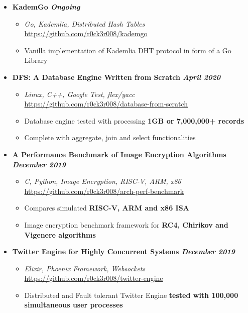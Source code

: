 \documentclass[9]{Resume}
\begin{document}
\begin{itemize}[noitemsep,nolistsep]
	\item[]\textbf{KademGo \hfill \textit{Ongoing}}
		\begin{itemize}[leftmargin=*]
			\setlength\itemsep{-0.25em}
			\item[\textbullet]\textit{Go, Kademlia, Distributed Hash Tables} \hfill \href{https://github.com/r0ck3r008/kademgo}{{\scriptsize https://github.com/r0ck3r008/kademgo}}
			\item[\textbullet]Vanilla implementation of Kademlia DHT protocol in form of a Go Library
		\end{itemize}

	\item[]\textbf{DFS: A Database Engine Written from Scratch \hfill \textit{April 2020}}
		\begin{itemize}[leftmargin=*]
			\setlength\itemsep{-0.25em}
			\item[\textbullet]\textit{Linux, C++, Google Test, flex/yacc} \hfill \href{https://github.com/r0ck3r008/database-from-scratch}{{\scriptsize https://github.com/r0ck3r008/database-from-scratch}}
			\item[\textbullet]Database engine tested with processing \textbf{1GB or 7,000,000+ records}
			\item[\textbullet]Complete with aggregate, join and select functionalities
		\end{itemize}

	\item[]\textbf{A Performance Benchmark of Image Encryption Algorithms \hfill \textit{December 2019}}
		\begin{itemize}[leftmargin=*]
			\setlength\itemsep{-0.25em}
			\item[\textbullet]\textit{C, Python, Image Encryption, RISC-V, ARM, x86} \hfill \href{https://github.com/r0ck3r008/arch-perf-benchmark}{{\scriptsize https://github.com/r0ck3r008/arch-perf-benchmark}}
			\item[\textbullet]Compares simulated \textbf{RISC-V, ARM and x86 ISA}
			\item[\textbullet]Image encryption benchmark framework for \textbf{RC4, Chirikov and Vigenere algorithms}
		\end{itemize}

	\item[]\textbf{Twitter Engine for Highly Concurrent Systems \hfill \textit{December 2019}}
		\begin{itemize}[leftmargin=*]
			\setlength\itemsep{-0.25em}
			\item[\textbullet]\textit{Elixir, Phoenix Framework, Websockets} \hfill \href{https://github.com/r0ck3r008/twitter-engine}{{\scriptsize https://github.com/r0ck3r008/twitter-engine}}
			\item[\textbullet]Distributed and Fault tolerant Twitter Engine \textbf{tested with 100,000 simultaneous user processes}
		\end{itemize}


\end{itemize}
\end{document}
